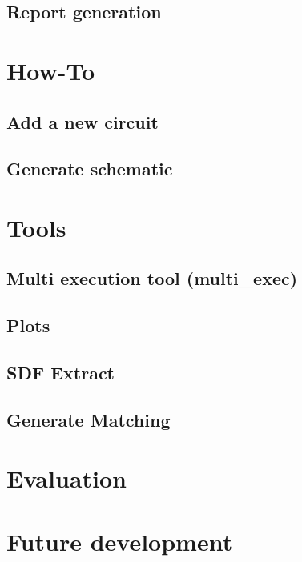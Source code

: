 \documentclass[a4,12pt,hidelinks]{article}
\newcommand{\multiexec}{multi\_exec}
\begin{document}
\subsection{Report generation}
\label{sec:man-configuration-report}


\section{How-To}
\label{sec:man-howto}

\subsection{Add a new circuit}
\label{sec:man-howto-circuit}


\subsection{Generate schematic}
\label{sec:man-howto-schematic}


\section{Tools}
\label{sec:man-tools}

\subsection{Multi execution tool (\multiexec)}
\label{sec:man-tools-multiexec}


\subsection{Plots}
\label{sec:man-plots}


\subsection{SDF Extract}
\label{sec:man-sdf-extract}


\subsection{Generate Matching}
\label{sec:man-generate-matching}


\section{Evaluation}
\label{sec:man-evaluation}


\section{Future development}
\label{sec:man-future-development}




\end{document}
